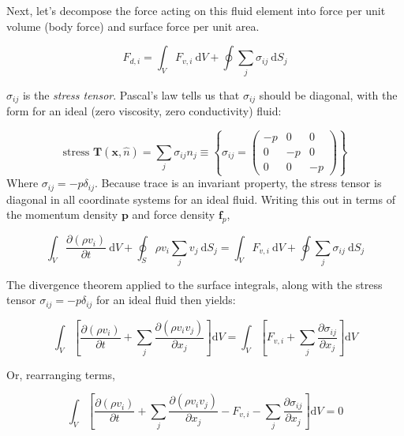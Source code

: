 \documentclass[notoc]{tufte-handout}
\renewcommand{\vec}[1]{
\mathbf{#1}
}
\begin{document}
Next, let's decompose the force acting on this fluid element into force per unit volume (body force) and surface force per unit area. 

\begin{equation}
    F_{d,i} = \int_V F_{v,i}~\mathrm{d}V + \oint \sum_j \sigma_{ij}~\mathrm{d}S_j
\end{equation}

$\sigma_{ij}$ is the \textit{stress tensor}. Pascal's law tells us that $\sigma_{ij}$ should be diagonal, with the form for an ideal (zero viscosity, zero conductivity) fluid:

\begin{equation}
\text{stress }\vec{T}(\vec{x},\hat{n}) = \sum_j\sigma_{ij}n_j \equiv \left\{ \sigma_{ij} = \begin{pmatrix}
    -p & 0 & 0 \\
    0 & -p & 0 \\
    0 & 0 & -p
\end{pmatrix} \right\}
\end{equation}
Where $\sigma_{ij}=-p\delta_{ij}$. Because trace is an invariant property, the stress tensor is diagonal in all coordinate systems for an ideal fluid. Writing this out in terms of the momentum density $\vec{p}$  and force density $\vec{f}_p$,

\begin{equation}
\int_V \frac{\partial(\rho {v}_i)}{\partial t}~\mathrm{d}V + \oint_S \rho v_i \sum_j v_j~\mathrm{d}S_j = \int_V F_{v,i}~\mathrm{d}V + \oint \sum_j \sigma_{ij}~\mathrm{d}S_j
\end{equation}

The divergence theorem applied to the surface integrals, along with the stress tensor $\sigma_{ij}=-p\delta_{ij}$ for an ideal fluid then yields:

\begin{equation}
\int_V \left[ \frac{\partial(\rho {v}_i)}{\partial t} + \sum_j \frac{\partial(\rho {v}_iv_j)}{\partial x_j} \right]\mathrm{d}V = \int_V \left[ F_{v,i} + \sum_j \frac{\partial \sigma_{ij}}{\partial x_j} \right]\mathrm{d}V
\end{equation}

Or, rearranging terms,

\begin{equation}
\int_V \left[ \frac{\partial(\rho {v}_i)}{\partial t} + \sum_j \frac{\partial(\rho {v}_iv_j)}{\partial x_j} - F_{v,i} - \sum_j \frac{\partial \sigma_{ij}}{\partial x_j} \right]\mathrm{d}V    = 0
\end{equation}
\end{document}
